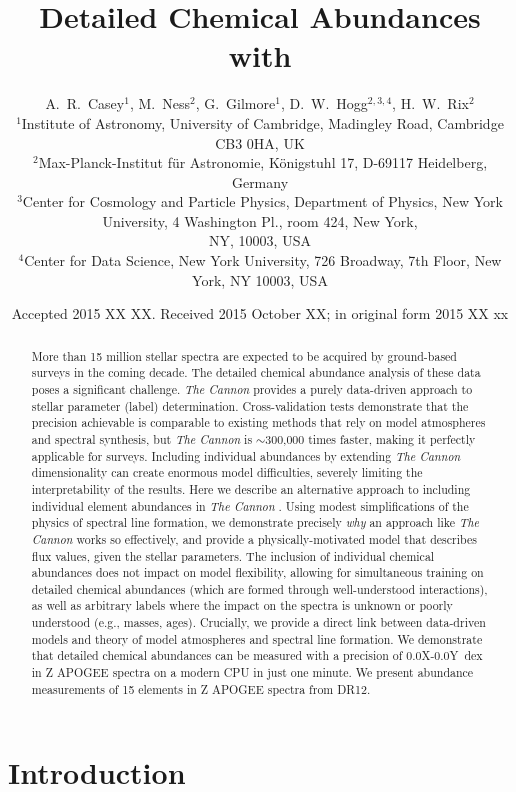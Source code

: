 \documentclass[useAMS,usenatbib]{mn2e}
\title[Cannon Chemistry]{Detailed Chemical Abundances with \tc}
\author[Casey et al.]{A.~R.~Casey$^1$, M.~Ness$^2$, G.~Gilmore$^1$,
    D.~W.~Hogg$^{2,3,4}$, H.~W.~Rix$^2$ \\ 
$^1$Institute of Astronomy, University of Cambridge, Madingley Road, Cambridge
    CB3 0HA, UK\\
$^2$Max-Planck-Institut f\"ur Astronomie, K\"onigstuhl 17, D-69117 Heidelberg,
    Germany\\
$^3$Center for Cosmology and Particle Physics, Department of Physics, New York
    University, 4 Washington Pl., room 424, New York, \\
    NY, 10003, USA\\
$^4$Center for Data Science, New York University, 726 Broadway, 7th Floor,
    New York, NY 10003, USA}
\newcommand\tc{\textit{The Cannon} }
\begin{document}
\date{Accepted 2015 XX XX. Received 2015 October XX; in original form 2015 XX xx}

\pagerange{\pageref{firstpage}--\pageref{lastpage}} 

\maketitle

\label{firstpage}

\begin{abstract}
More than 15 million stellar spectra are expected to be acquired by ground-based surveys in
the coming decade. The detailed chemical abundance analysis of these data poses
a significant challenge. \tc provides a purely data-driven
approach to stellar parameter (label) determination. Cross-validation tests
demonstrate that the precision achievable is comparable to existing methods that
rely on model atmospheres and spectral synthesis, but \tc is $\sim$300,000 times
faster, making it perfectly applicable for surveys. Including individual abundances by extending \tc dimensionality can create enormous model difficulties, severely limiting the interpretability of the results. Here
we describe an alternative approach to including individual element abundances
in \tc. Using modest simplifications of the physics of spectral line formation,
we demonstrate precisely \textit{why} an approach like \tc works so effectively,
and provide a physically-motivated model that describes flux values, given the
stellar parameters. The inclusion of individual chemical abundances does not
impact on model flexibility, allowing for simultaneous training on detailed
chemical abundances (which are formed through well-understood interactions), as well as arbitrary labels where the impact on the spectra
is unknown or poorly understood (e.g., masses, ages). Crucially, we provide a direct link
between data-driven models and theory of model atmospheres and spectral line formation. We demonstrate that
detailed chemical abundances can be measured with a precision of 0.0X-0.0Y~dex
in Z APOGEE spectra on a modern CPU in just one minute. We present abundance
measurements of 15 elements in Z APOGEE spectra from DR12.
\end{abstract}

\begin{keywords}
\end{keywords}

\section{Introduction}
\label{sec:introduction}
\end{document}
